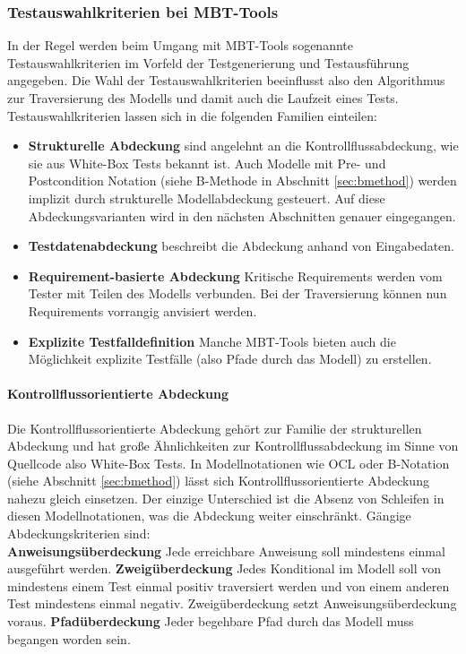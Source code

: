 \subsubsection{Testauswahlkriterien bei MBT-Tools}
In der Regel werden beim Umgang mit MBT-Tools sogenannte Testauswahlkriterien im Vorfeld der Testgenerierung und Testausführung angegeben. Die Wahl der Testauswahlkriterien beeinflusst also den Algorithmus zur Traversierung des Modells und damit auch die Laufzeit eines Tests.\\
Testauswahlkriterien lassen sich in die folgenden Familien einteilen:

\begin{itemize}
\item \textbf{Strukturelle Abdeckung} sind angelehnt an die Kontrollflussabdeckung, wie sie aus White-Box Tests bekannt ist. Auch Modelle mit Pre- und Postcondition Notation (siehe B-Methode in Abschnitt \ref{sec:bmethod}) werden implizit durch strukturelle Modellabdeckung gesteuert. Auf diese Abdeckungsvarianten wird in den nächsten Abschnitten genauer eingegangen.
\item \textbf{Testdatenabdeckung} beschreibt die Abdeckung anhand von Eingabedaten.
\item \textbf{Requirement-basierte Abdeckung} Kritische Requirements werden vom Tester mit Teilen des Modells verbunden. Bei der Traversierung können nun Requirements vorrangig anvisiert werden.
\item \textbf{Explizite Testfalldefinition} Manche MBT-Tools bieten auch die Möglichkeit explizite Testfälle (also Pfade durch das Modell) zu erstellen.
\end{itemize}

\paragraph{Kontrollflussorientierte Abdeckung}
Die Kontrollflussorientierte Abdeckung gehört zur Familie der strukturellen Abdeckung und hat große Ähnlichkeiten zur Kontrollflussabdeckung im Sinne von Quellcode also White-Box Tests. In Modellnotationen wie OCL oder B-Notation (siehe Abschnitt \ref{sec:bmethod}) lässt sich Kontrollflussorientierte Abdeckung nahezu gleich einsetzen. Der einzige Unterschied ist die Absenz von Schleifen in diesen Modellnotationen, was die Abdeckung weiter einschränkt. Gängige Abdeckungskriterien sind:\cite{rossner_basiswissen_2010}\\
\textbf{Anweisungsüberdeckung} Jede erreichbare Anweisung soll mindestens einmal ausgeführt werden.
\textbf{Zweigüberdeckung} Jedes Konditional im Modell soll von mindestens einem Test einmal positiv traversiert werden und von einem anderen Test mindestens einmal negativ. Zweigüberdeckung setzt Anweisungsüberdeckung voraus.
\textbf{Pfadüberdeckung} Jeder begehbare Pfad durch das Modell muss begangen worden sein.

